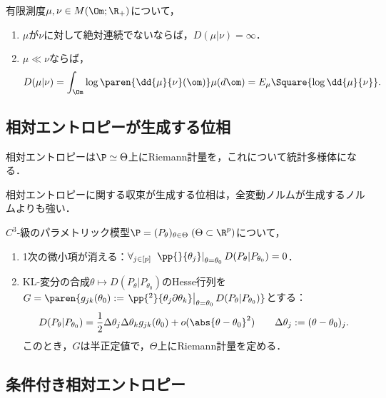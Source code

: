 \documentclass[uplatex,dvipdfmx]{jsreport}
\begin{document}
\begin{theorem}[積分表示]\label{thm-integral-expression-of-KL-divergence}
    有限測度$\mu,\nu\in M(\Om;\R_+)$について，
    \begin{enumerate}
        \item $\mu$が$\nu$に対して絶対連続でないならば，$D(\mu|\nu)=\infty$．
        \item $\mu\ll\nu$ならば，
        \[D(\mu|\nu)=\int_\Om\log\paren{\dd{\mu}{\nu}(\om)}\mu(d\om)=E_\mu\Square{\log\dd{\mu}{\nu}}.\]
    \end{enumerate}
\end{theorem}

\subsection{相対エントロピーが生成する位相}

\begin{tcolorbox}[colframe=ForestGreen, colback=ForestGreen!10!white,breakable,colbacktitle=ForestGreen!40!white,coltitle=black,fonttitle=\bfseries\sffamily,
title=]
    相対エントロピーは$\P\simeq\Theta$上にRiemann計量を，これについて統計多様体になる．
\end{tcolorbox}

\begin{proposition}
    相対エントロピーに関する収束が生成する位相は，全変動ノルムが生成するノルムよりも強い．
\end{proposition}

\begin{theorem}[Fisher計量]
    $C^3$-級のパラメトリック模型$\P=(P_\theta)_{\theta\in\Theta}\;(\Theta\subset\R^p)$について，
    \begin{enumerate}
        \item 1次の微小項が消える：$\forall_{j\in[p]}\;\left.\pp{}{\theta_j}\right|_{\theta=\theta_0}D(P_\theta|P_{\theta_0})=0$．
        \item KL-変分の合成$\theta\mapsto D(P_\theta|P_{\theta_0})$のHesse行列を$G=\paren{g_{jk}(\theta_0):=\left.\pp{^2}{\theta_j\partial\theta_k}\right|_{\theta=\theta_0}D(P_\theta|P_{\theta_0})}$とする：
        \[D(P_\theta|P_{\theta_0})=\frac{1}{2}\Delta\theta_j\Delta\theta_kg_{jk}(\theta_0)+o(\abs{\theta-\theta_0}^2)\qquad\Delta\theta_j:=(\theta-\theta_0)_j.\]
        このとき，$G$は半正定値で，$\Theta$上にRiemann計量を定める．
    \end{enumerate}
\end{theorem}

\subsection{条件付き相対エントロピー}
\end{document}
